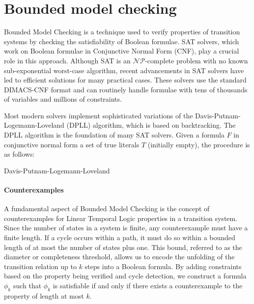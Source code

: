 \section{Bounded model checking}

Bounded Model Checking is a technique used to verify properties of transition systems by checking the satisfiability of Boolean formulae. 
SAT solvers, which work on Boolean formulae in Conjunctive Normal Form (CNF), play a crucial role in this approach. 
Although SAT is an $\mathcal{NP}$-complete problem with no known sub-exponential worst-case algorithm, recent advancements in SAT solvers have led to efficient solutions for many practical cases. 
These solvers use the standard DIMACS-CNF format and can routinely handle formulae with tens of thousands of variables and millions of constraints. 

Most modern solvers implement sophisticated variations of the Davis-Putnam-Logemann-Loveland (DPLL) algorithm, which is based on backtracking.
The DPLL algorithm is the foundation of many SAT solvers.
Given a formula $F$ in conjunctive normal form a set of true literals $T$ (initially empty), the procedure is as follows:
\begin{algorithm}[H]
    \caption{Davis-Putnam-Logemann-Loveland}
\end{algorithm}

\paragraph*{Counterexamples}
A fundamental aspect of Bounded Model Checking is the concept of counterexamples for Linear Temporal Logic properties in a transition system. 
Since the number of states in a system is finite, any counterexample must have a finite length.
If a cycle occurs within a path, it must do so within a bounded length of at most the number of states plus one. 
This bound, referred to as the diameter or completeness threshold, allows us to encode the unfolding of the transition relation up to $k$ steps into a Boolean formula. 
By adding constraints based on the property being verified and cycle detection, we construct a formula $\phi_k$ such that $\phi_k$ is satisfiable if and only if there exists a counterexample to the property of length at most $k$.

